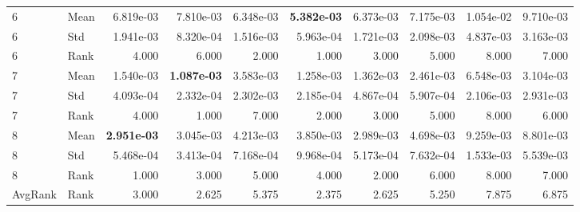 \begin{table}[t]
\begin{tabular}{llrrrrrrrr}
6 & Mean & 6.819e-03 & 7.810e-03 & 6.348e-03 & \textbf{5.382e-03} & 6.373e-03 & 7.175e-03 & 1.054e-02 & 9.710e-03 \\
6 & Std & 1.941e-03 & 8.320e-04 & 1.516e-03 & 5.963e-04 & 1.721e-03 & 2.098e-03 & 4.837e-03 & 3.163e-03 \\
6 & Rank & 4.000 & 6.000 & 2.000 & 1.000 & 3.000 & 5.000 & 8.000 & 7.000 \\
7 & Mean & 1.540e-03 & \textbf{1.087e-03} & 3.583e-03 & 1.258e-03 & 1.362e-03 & 2.461e-03 & 6.548e-03 & 3.104e-03 \\
7 & Std & 4.093e-04 & 2.332e-04 & 2.302e-03 & 2.185e-04 & 4.867e-04 & 5.907e-04 & 2.106e-03 & 2.931e-03 \\
7 & Rank & 4.000 & 1.000 & 7.000 & 2.000 & 3.000 & 5.000 & 8.000 & 6.000 \\
8 & Mean & \textbf{2.951e-03} & 3.045e-03 & 4.213e-03 & 3.850e-03 & 2.989e-03 & 4.698e-03 & 9.259e-03 & 8.801e-03 \\
8 & Std & 5.468e-04 & 3.413e-04 & 7.168e-04 & 9.968e-04 & 5.173e-04 & 7.632e-04 & 1.533e-03 & 5.539e-03 \\
8 & Rank & 1.000 & 3.000 & 5.000 & 4.000 & 2.000 & 6.000 & 8.000 & 7.000 \\
AvgRank & Rank & 3.000 & 2.625 & 5.375 & 2.375 & 2.625 & 5.250 & 7.875 & 6.875 \\
\hline
\end{tabular}
\end{table}
